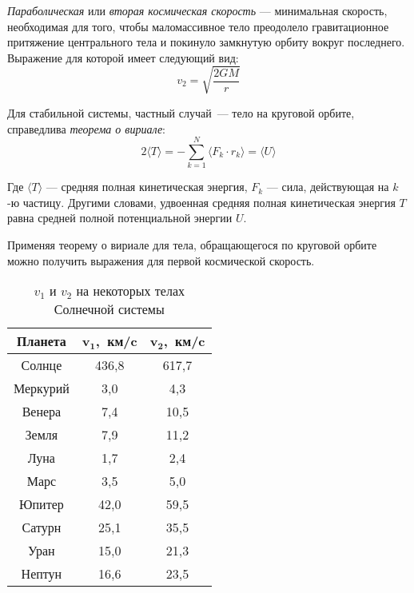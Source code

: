 \textit{Параболическая} или \textit{вторая космическая скорость} --- 
минимальная скорость, необходимая для того, чтобы маломассивное тело преодолело 
гравитационное притяжение центрального тела и покинуло замкнутую орбиту вокруг 
последнего. Выражение для которой имеет следующий вид:\begin{equation}
v_{2}=\sqrt{\frac{2GM}{r}}
\end{equation}

Для стабильной системы, частный случай~--- тело на круговой орбите, справедлива 
{\itshape теорема о вириале}:
\begin{equation}
2 \langle T\rangle 
= -\sum _{{k=1}}^{N}\langle {F}_{k}\cdot {r}_{k}\rangle 
= \langle U \rangle
\end{equation}

Где $\langle T\rangle$ --- средняя полная кинетическая энергия, $F_k$ --- сила, 
действующая на $k$-ю частицу. Другими словами, удвоенная средняя полная 
кинетическая энергия $T$ равна средней полной потенциальной энергии $U$. 

Применяя теорему о вириале для тела, обращающегося по круговой орбите можно 
получить выражения для первой космической скорость.

\begin{table}[h!]
\centering
\begin{tabular}{|c|c|c|}
\hline
\textbf{Планета} & $\mathbf{v_1}$,~\textbf{км/c} & 
$\mathbf{v_2}$,~\textbf{км/c}\\
\hline
Солнце & 436,8 & 617,7\\
\hline
Меркурий & 3,0 & 4,3\\
\hline
Венера & 7,4 & 10,5\\
\hline
Земля & 7,9 & 11,2\\
\hline
Луна & 1,7 & 2,4\\
\hline
Марс & 3,5 & 5,0\\
\hline
Юпитер & 42,0 & 59,5\\
\hline
Сатурн & 25,1 & 35,5\\
\hline
Уран & 15,0 & 21,3\\
\hline
Нептун & 16,6 & 23,5\\
\hline
\end{tabular}
\caption{$v_1$ и $v_2$ на некоторых телах Солнечной системы}
\end{table}




